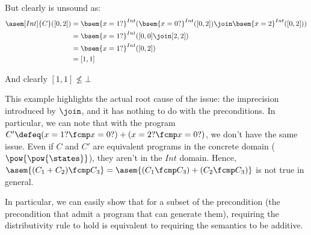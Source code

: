 \begin{example}
  But clearly is unsound as:
  \begin{align*}
    \asem[Int]{C}([0, 2]) &= \bsem{x = 1?}^{Int}(\bsem{x = 0?}^{Int}([0, 2]) 
      \join \bsem{x = 2}^{Int}([0, 2])) \\
                          &= \bsem{x = 1?}^{Int}([0, 0] \join [2, 2]) \\
                          &= \bsem{x = 1?}^{Int}([0, 2]) \\
                          &= [1, 1]
  \end{align*}

  And clearly $[1, 1] \not \leq \bot$
\end{example}

This example highlights the actual root cause of the issue: the imprecision
introduced by $\join$, and it has nothing to do with the preconditions. In
particular, we can note that with the program $C' \defeq (x = 1? \fcmp x = 0?)
+ (x = 2? \fcmp x = 0?)$, we don't have the same issue. Even if $C$ and $C'$
are equivalent programs in the concrete domain ($\pow{\pow{\states}}$), they
aren't in the $Int$ domain. Hence, $\asem{(C_1 + C_2) \fcmp C_3} = \asem{(C_1
\fcmp C_3) + (C_2 \fcmp C_3)}$ is not true in general.

In particular, we can easily show that for a subset of the precondition (the
precondition that admit a program that can generate them), requiring the
distributivity rule to hold is equivalent to requiring the semantics to be
additive.

